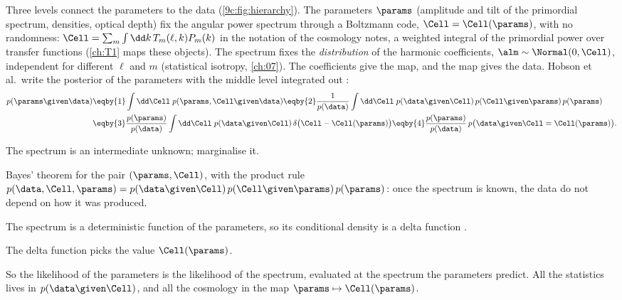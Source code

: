 Three levels connect the parameters to the data (\cref{9c:fig:hierarchy}). The parameters $\params$
(amplitude and tilt of the primordial spectrum, densities, optical depth) fix the angular power
spectrum through a Boltzmann code, $\Cell=\Cell(\params)$, with no randomness:
$\Cell=\sum_m\int\dd k\,T_m(\ell,k)P_m(k)$ in the notation of the cosmology notes, a weighted integral
of the primordial power over transfer functions (\cref{ch:T1} maps these objects). The spectrum fixes the \emph{distribution} of the
harmonic coefficients, $\alm\sim\Normal(0,\Cell)$, independent for different $\ell$ and $m$
(statistical isotropy, \cref{ch:07}). The coefficients give the map, and the map gives the data.
Hobson et al.\ write the posterior of the parameters with the middle level integrated out
:
\begin{align}
  p(\params\given\data)
  &\eqby{1}\int\dd\Cell\;p(\params,\Cell\given\data)
   \eqby{2}\frac{1}{p(\data)}\int\dd\Cell\;p(\data\given\Cell)\,p(\Cell\given\params)\,p(\params)
   \nonumber\\
  &\eqby{3}\frac{p(\params)}{p(\data)}\int\dd\Cell\;p(\data\given\Cell)\,\delta\bigl(\Cell-\Cell(\params)\bigr)
   \eqby{4}\frac{p(\params)}{p(\data)}\,p\bigl(\data\given\Cell=\Cell(\params)\bigr).
  \label{9c:eq:hier}
\end{align}
\begin{explain}
  \item The spectrum is an intermediate unknown; marginalise it.
  \item Bayes' theorem for the pair $(\params,\Cell)$, with the product rule
        $p(\data,\Cell,\params)=p(\data\given\Cell)\,p(\Cell\given\params)\,p(\params)$: once the spectrum is
        known, the data do not depend on how it was produced.
  \item The spectrum is a deterministic function of the parameters, so its conditional density is a
        delta function .
  \item The delta function picks the value $\Cell(\params)$.
\end{explain}
So the likelihood of the parameters is the likelihood of the spectrum, evaluated at the spectrum the
parameters predict. All the statistics lives in $p(\data\given\Cell)$, and all the cosmology in the map
$\params\mapsto\Cell(\params)$.

